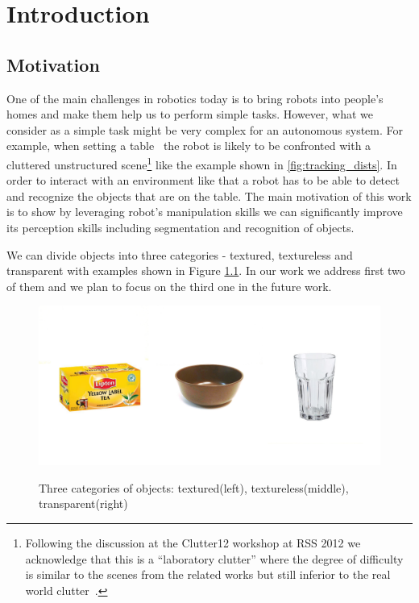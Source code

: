 \chapter{Introduction}
\label{chapter:Introduction}


 
\section{Motivation}
\label{sec:intro}
One of the main challenges in robotics today is to bring robots into people's homes and make them help us to perform simple tasks. However, what we consider as a simple task might be very complex for an autonomous system. For example, when setting a table~\cite{iros10kcopman} the robot is likely to be
confronted with a cluttered unstructured scene\footnote{Following the discussion at the Clutter12
workshop at RSS 2012 we acknowledge that this is a ``laboratory clutter'' where the degree of difficulty
is similar to the scenes from the related works but still inferior to the real world clutter~\cite{matei2010manipulation}.} like the example shown
in \ref{fig:tracking_dists}. In order to interact with an environment like that a robot has to be able to detect and recognize the objects that are on the table. The main
motivation of this work is to show by leveraging robot's manipulation skills we can significantly improve its perception skills including segmentation and recognition of objects.
	
We can divide objects into three categories - textured, textureless and transparent with examples shown in Figure \ref{fig:all-objects}. In our work we address first two of them and we plan to focus on the third one in the future work.

\begin{figure}

{\includegraphics[width=1\columnwidth]{figures/all-objects.jpg}}

\caption{Three categories of objects: textured(left), textureless(middle), transparent(right)}
\label{fig:all-objects}
\end{figure}

